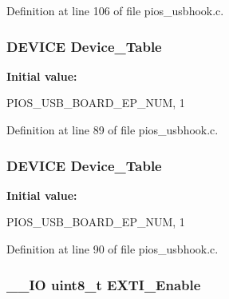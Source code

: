\-Definition at line 106 of file pios\-\_\-usbhook.\-c.

\hypertarget{group___p_i_o_s___u_s_b_h_o_o_k_gafa47e7c7d5d6fb4c682e16c89c1b7d75}{
\subsubsection[{\-Device\-\_\-\-Table}]{\setlength{\rightskip}{0pt plus 5cm}\-D\-E\-V\-I\-C\-E {\bf \-Device\-\_\-\-Table}}}\label{group___p_i_o_s___u_s_b_h_o_o_k_gafa47e7c7d5d6fb4c682e16c89c1b7d75}
{\bfseries \-Initial value\-:}
\begin{DoxyCode}
 {
        PIOS_USB_BOARD_EP_NUM,
        1
}
\end{DoxyCode}


\-Definition at line 89 of file pios\-\_\-usbhook.\-c.

\hypertarget{group___p_i_o_s___u_s_b_h_o_o_k_gafa47e7c7d5d6fb4c682e16c89c1b7d75}{
\subsubsection[{\-Device\-\_\-\-Table}]{\setlength{\rightskip}{0pt plus 5cm}\-D\-E\-V\-I\-C\-E {\bf \-Device\-\_\-\-Table}}}\label{group___p_i_o_s___u_s_b_h_o_o_k_gafa47e7c7d5d6fb4c682e16c89c1b7d75}
{\bfseries \-Initial value\-:}
\begin{DoxyCode}
 {
        PIOS_USB_BOARD_EP_NUM,
        1
}
\end{DoxyCode}


\-Definition at line 90 of file pios\-\_\-usbhook.\-c.

\hypertarget{group___p_i_o_s___u_s_b_h_o_o_k_ga80e4a20c4f7576283232cda440c47694}{
\subsubsection[{\-E\-X\-T\-I\-\_\-\-Enable}]{\setlength{\rightskip}{0pt plus 5cm}\-\_\-\-\_\-\-I\-O uint8\-\_\-t {\bf \-E\-X\-T\-I\-\_\-\-Enable}}}\label{group___p_i_o_s___u_s_b_h_o_o_k_ga80e4a20c4f7576283232cda440c47694}


